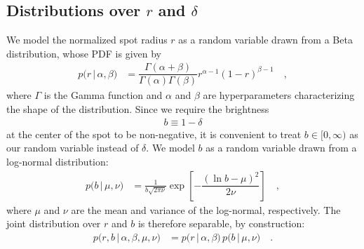 \documentclass[modern]{aastex62}
\begin{document}
\subsection{Distributions over $r$ and $\delta$}
%
We model the normalized spot radius $r$ as a random variable drawn from
a Beta distribution, whose PDF is given by
%
\begin{align}
    p \big(r \, \big| \, \alpha, \beta \big)
     & =
    \dfrac{\Gamma(\alpha + \beta)}{\Gamma(\alpha)\Gamma(\beta)}
    r^{\alpha - 1}
    (1 - r)^{\beta - 1}
    \quad,
\end{align}
%
where $\Gamma$ is the Gamma function and $\alpha$ and $\beta$ are
hyperparameters characterizing the shape of the distribution.
%
Since we require the brightness
%
\begin{align}
    b \equiv 1 - \delta
\end{align}
%
at the center of the spot to
be non-negative, it is convenient to treat $b \in [0, \infty)$ as our
random variable instead of $\delta$. We model $b$ as a random variable
drawn from a log-normal
distribution:
%
\begin{align}
    \label{eq:lognormal}
    p \big(b \, \big| \, \mu, \nu \big)
     & =
    \frac{1}{b\sqrt{2\pi\nu}}
    \exp\left[
        -\dfrac{\left(\ln b - \mu\right)^2}{2\nu}
        \right]
    \quad,
\end{align}
%
where $\mu$ and $\nu$ are the mean and variance of the log-normal, respectively.
The joint distribution over $r$ and $b$ is therefore separable,
by construction:
%
\begin{align}
    p \big( r, b \, \big| \, \alpha, \beta, \mu, \nu \big)
     & =
    p \big(r \, \big| \, \alpha, \beta \big)
    \,
    p \big(b \, \big| \, \mu, \nu \big)
    \quad.
\end{align}
%
\end{document}
